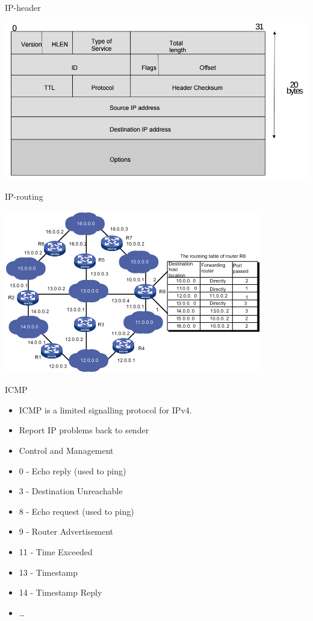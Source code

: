\documentclass{beamer}
\begin{document}
\begin{frame}{IP-header}
  \begin{center}
    \includegraphics[width=0.9\linewidth]{IP-header}
  \end{center}
\end{frame}

\begin{frame}{IP-routing}
  \begin{center}
    \includegraphics[width=0.9\linewidth]{table}
  \end{center}
\end{frame}

\begin{frame}{ICMP}
  \begin{itemize}
  \item ICMP is a limited signalling protocol for IPv4.
  \item Report IP problems back to sender
  \item Control and Management
  \item 0 - Echo reply (used to ping)
  \item 3 - Destination Unreachable
  \item 8 - Echo request (used to ping)
  \item 9 - Router Advertisement
  \item 11 - Time Exceeded
  \item 13 - Timestamp
  \item 14 - Timestamp Reply
  \item \dots
  \end{itemize}
\end{frame}
\end{document}
